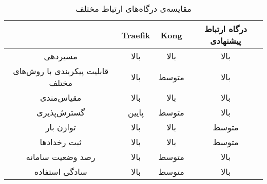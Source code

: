 \begin{table}[H]
    \centering
    \caption{مقایسه‌ی درگاه‌های ارتباط مختلف}\label{tab:gateways}
    \begin{tabular}{|c|c|c|c|}
        \hline
         & Traefik & Kong & درگاه ارتباط پیشنهادی\\
        \hline
        مسیردهی & بالا & بالا & بالا\\
        \hline
        قابلیت پیکر‌بندی با روش‌های مختلف & بالا & متوسط & بالا\\
        \hline
        مقیاس‌مندی & بالا & بالا & بالا\\
        \hline
        گسترش‌پذیری & پایین & متوسط & بالا\\
        \hline
        توازن بار & بالا & بالا & متوسط\\
        \hline
        ثبت رخداد‌ها & بالا & بالا & متوسط\\
        \hline
        رصد وضعیت سامانه & بالا & متوسط & بالا\\
        \hline
        سادگی استفاده & بالا & متوسط & بالا\\
        \hline
    \end{tabular}
\end{table}

\cleardoublepage 